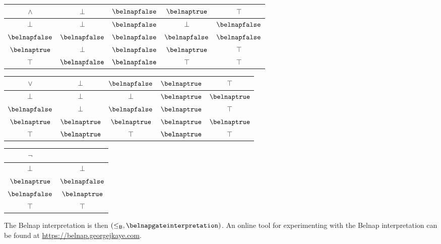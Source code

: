 \documentclass{lmcs}
\begin{document}
\begin{exa}
    \begin{center}
        \begin{tabular}{|c|cccc|}
            \hline
            \(\land\)        & \(\bot\)         & \(\belnapfalse\) & \(\belnaptrue\)  & \(\top\)         \\
            \hline
            \(\bot\)         & \(\bot\)         & \(\belnapfalse\) & \(\bot\)         & \(\belnapfalse\) \\
            \(\belnapfalse\) & \(\belnapfalse\) & \(\belnapfalse\) & \(\belnapfalse\) & \(\belnapfalse\) \\
            \(\belnaptrue\)  & \(\bot\)         & \(\belnapfalse\) & \(\belnaptrue\)  & \(\top\)         \\
            \(\top\)         & \(\belnapfalse\) & \(\belnapfalse\) & \(\top\)         & \(\top\)         \\
            \hline
        \end{tabular}
        \quad
        \begin{tabular}{|c|cccc|}
            \hline
            \(\lor\)         & \(\bot\)        & \(\belnapfalse\) & \(\belnaptrue\) & \(\top\)        \\
            \hline
            \(\bot\)         & \(\bot\)        & \(\bot\)         & \(\belnaptrue\) & \(\belnaptrue\) \\
            \(\belnapfalse\) & \(\bot\)        & \(\belnapfalse\) & \(\belnaptrue\) & \(\top\)        \\
            \(\belnaptrue\)  & \(\belnaptrue\) & \(\belnaptrue\)  & \(\belnaptrue\) & \(\belnaptrue\) \\
            \(\top\)         & \(\belnaptrue\) & \(\top\)         & \(\belnaptrue\) & \(\top\)        \\
            \hline
        \end{tabular}
        \quad
        \begin{tabular}{|c|c|}
            \hline
            \(\neg\)         &                  \\
            \hline
            \(\bot\)         & \(\bot\)         \\
            \(\belnaptrue\)  & \(\belnapfalse\) \\
            \(\belnapfalse\) & \(\belnaptrue\)  \\
            \(\top\)         & \(\top\)         \\
            \hline
        \end{tabular}
    \end{center}

    The Belnap interpretation is then \(
    (\leq_\mathsf{B}, \belnapgateinterpretation)
    \).
    An online tool for experimenting with the Belnap interpretation can be found
    at \url{https://belnap.georgejkaye.com}.
\end{exa}
\end{document}
